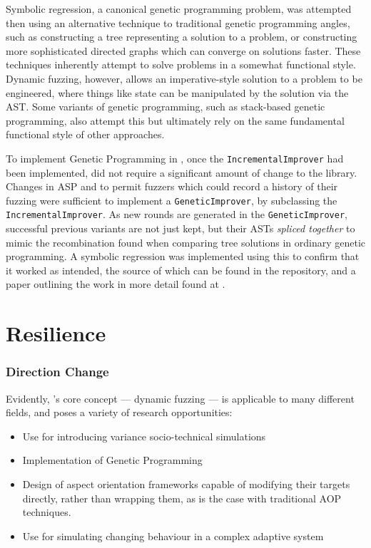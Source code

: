 \documentclass[draft]{article}
\begin{document}
Symbolic regression, a canonical genetic programming problem, was attempted then
using an alternative technique to traditional genetic programming angles, such
as constructing a tree representing a solution to a
problem\cite{koza1994genetic}, or constructing more sophisticated directed
graphs which can converge on solutions faster\cite{cartesian_gp}. These
techniques inherently attempt to solve problems in a somewhat functional style.
Dynamic fuzzing, however, allows an imperative-style solution to a problem to be
engineered, where things like state can be manipulated by the solution via the
AST. Some variants of genetic programming, such as stack-based genetic
programming, also attempt this\cite{stack_based_gp} but ultimately rely on the
same fundamental functional style of other approaches.\par

To implement Genetic Programming in \pdsf{}, once the
\texttt{IncrementalImprover} had been implemented, did not require a significant
amount of change to the library. Changes in ASP and \pdsf{} to permit fuzzers
which could record a history of their fuzzing were sufficient to implement
a \texttt{GeneticImprover}, by subclassing the \texttt{IncrementalImprover}. As
new rounds are generated in the \texttt{GeneticImprover}, successful previous
variants are not just kept, but their ASTs \emph{spliced together} to mimic the
recombination found when comparing tree solutions in ordinary
genetic programming\cite{koza1994genetic}. A symbolic regression was implemented
using this to confirm that it worked as intended, the source of which can be
found in the \pdsf{} repository\cite{pydysofu_repo}, and a paper outlining the
work in more detail found at \cite{realx_paper}.



\part{Resilience}
\label{part:resilience}
\section{Direction Change}
Evidently, \pdsf{}'s core concept --- dynamic fuzzing --- is applicable to many
different fields, and poses a variety of research opportunities:

\begin{itemize}
\item Use for introducing variance socio-technical simulations\cite{honours_thesis}
\item Implementation of Genetic Programming
\item Design of aspect orientation frameworks capable of modifying their targets
  directly, rather than wrapping them, as is the case with traditional AOP
  techniques\cite{aspectj}.
\item Use for simulating changing behaviour in a complex adaptive system
\end{itemize}
\end{document}
